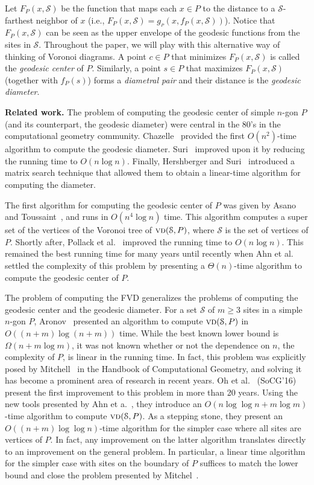 \documentclass[a4paper,UKenglish]{socg-lipics-v2018}
\newcommand{\F}[2][P]{\ensuremath{F_{\scriptscriptstyle #1}(#2)}}
\newcommand{\s}{\mathcal S}
\newcommand{\g}[3][P]{\ensuremath{g{_{_{#1}}}(#2, #3)}}
\newcommand{\f}[2][P]{\ensuremath{f_{\scriptscriptstyle #1}(#2)}}
\newcommand{\vd}[2][P]{\textsc{vd}(#2, #1)}
\begin{document}
Let $\F{x, \s}$ be the function that maps each $x\in P$ to the distance to a $\s$-farthest neighbor of $x$ (i.e., $\F{x, \s} = \g{x}{\f{x, \s}}$).
Notice that $\F{x, \s}$ can be seen as the upper envelope of the geodesic functions from the sites in $\s$.
Throughout the paper, we will play with this alternative way of thinking of Voronoi diagrams.
A point $c\in P$ that minimizes $\F{x, \s}$ is called the \emph{geodesic center} of $P$. 
Similarly, a point $s\in P$ that maximizes $\F{x, \s}$ (together with $\f{s}$) forms a \emph{diametral pair} and their distance is the \emph{geodesic diameter}. 

\textbf{Related work.} 
The problem of computing the geodesic center of simple $n$-gon $P$ (and its counterpart, the geodesic diameter) were central in the 80's in the computational geometry community. 
Chazelle~\cite{c-tpca-82} provided the first $O(n^2)$-time algorithm to compute the geodesic diameter.
Suri~\cite{suri1989computing} improved upon it by reducing the running time to $O(n\log n)$. 
Finally, Hershberger and Suri~\cite{hershberger1993matrix} introduced a matrix search technique that allowed them to obtain a linear-time algorithm for computing the diameter.

The first algorithm for computing the geodesic center of $P$ was given by Asano and Toussaint~\cite{at-cgcsp-85}, and runs in $O(n^4\log n)$ time.  
This algorithm computes a super set of the vertices of the Voronoi tree of $\vd{\s}$, where $\s$ is the set of vertices of $P$.  
Shortly after, Pollack et al.~\cite{pollackComputingCenter} improved the running time to $O(n\log n)$.  
This remained the best running time for many years until recently when Ahn et al.~\cite{ahn2015linear} settled the complexity of this problem by presenting a $\Theta(n)$-time algorithm to compute the geodesic center of $P$. 

The problem of computing the FVD generalizes the problems of computing the geodesic center and the geodesic diameter.  
For a set $\s$ of $m\geq 3$ sites in a simple $n$-gon $P$, Aronov~\cite{aronov1993furthest} presented an algorithm to compute $\vd{\s}$ in $O((n+m)\log (n+ m))$ time.  
While the best known lower bound is $\Omega(n + m \log m)$, it was not known whether or not the dependence on $n$, the complexity of $P$, is linear in the running time.  
In fact, this problem was explicitly posed by Mitchell~\cite[Chapter 27]{m-gspno-00} in the Handbook of Computational Geometry, and solving it has become a prominent area of research in recent years.
Oh et al.~\cite{oh2016farthest} (SoCG'16) present the first improvement to this problem in more than 20 years. 
Using the new tools presented by Ahn et a.~\cite{ahn2015linear}, they introduce an $O(n \log\log n+m\log m)$-time algorithm to compute $\vd{\s}$. 
As a stepping stone, they present an $O((n+m)\log\log n)$-time algorithm for the simpler case where all sites are vertices of $P$.
In fact, any improvement on the latter algorithm translates directly to an improvement on the general problem.
In particular, a linear time algorithm for the simpler case with sites on the boundary of $P$ suffices to match the lower bound and close the problem presented by Mitchel~\cite[Chapter 27]{m-gspno-00}.
\end{document}
